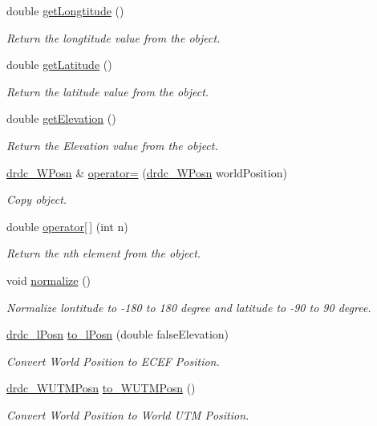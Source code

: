 \begin{CompactItemize}
double \hyperlink{classdrdc__WPosn_c0ee4adae6fd10005bddc94e98d0cd8c}{getLongtitude} ()
\begin{CompactList}\small\item\em Return the longtitude value from the object. \item\end{CompactList}\item 
double \hyperlink{classdrdc__WPosn_7f4a2e744cfbe93e6f94a3a8bf8f1b47}{getLatitude} ()
\begin{CompactList}\small\item\em Return the latitude value from the object. \item\end{CompactList}\item 
double \hyperlink{classdrdc__WPosn_b5d7565b125a7e107590847b2508a2e0}{getElevation} ()
\begin{CompactList}\small\item\em Return the Elevation value from the object. \item\end{CompactList}\item 
\hyperlink{classdrdc__WPosn}{drdc\_\-WPosn} \& \hyperlink{classdrdc__WPosn_f8dff958f4bedb7fc87a40710bc8b718}{operator=} (\hyperlink{classdrdc__WPosn}{drdc\_\-WPosn} worldPosition)
\begin{CompactList}\small\item\em Copy object. \item\end{CompactList}\item 
double \hyperlink{classdrdc__WPosn_a23e47dbf32b6819309d628b268aca46}{operator\mbox{[}$\,$\mbox{]}} (int n)
\begin{CompactList}\small\item\em Return the nth element from the object. \item\end{CompactList}\item 
void \hyperlink{classdrdc__WPosn_1ee5a6abd458cb83f456abfe72eb0d66}{normalize} ()
\begin{CompactList}\small\item\em Normalize lontitude to -180 to 180 degree and latitude to -90 to 90 degree. \item\end{CompactList}\item 
\hyperlink{classdrdc__lPosn}{drdc\_\-lPosn} \hyperlink{classdrdc__WPosn_d277ac3e0f3a88e72d59297c0e2fcc46}{to\_\-lPosn} (double falseElevation)
\begin{CompactList}\small\item\em Convert World Position to ECEF Position. \item\end{CompactList}\item 
\hyperlink{classdrdc__WUTMPosn}{drdc\_\-WUTMPosn} \hyperlink{classdrdc__WPosn_a12b36984bf6e77147cdbe1fd17c9bcd}{to\_\-WUTMPosn} ()
\begin{CompactList}\small\item\em Convert World Position to World UTM Position. \item\end{CompactList}\end{CompactItemize}
